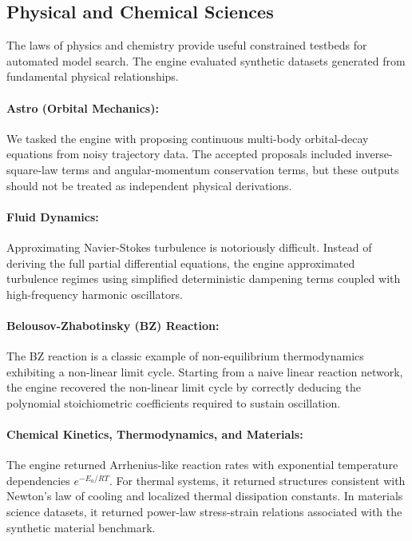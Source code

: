 \subsection{Physical and Chemical Sciences}

The laws of physics and chemistry provide useful constrained testbeds for automated model search. The engine evaluated synthetic datasets generated from fundamental physical relationships.

\paragraph{Astro (Orbital Mechanics):} We tasked the engine with proposing continuous multi-body orbital-decay equations from noisy trajectory data. The accepted proposals included inverse-square-law terms and angular-momentum conservation terms, but these outputs should not be treated as independent physical derivations.
\paragraph{Fluid Dynamics:} Approximating Navier-Stokes turbulence is notoriously difficult. Instead of deriving the full partial differential equations, the engine approximated turbulence regimes using simplified deterministic dampening terms coupled with high-frequency harmonic oscillators.
\paragraph{Belousov-Zhabotinsky (BZ) Reaction:} The BZ reaction is a classic example of non-equilibrium thermodynamics exhibiting a non-linear limit cycle. Starting from a naive linear reaction network, the engine recovered the non-linear limit cycle by correctly deducing the polynomial stoichiometric coefficients required to sustain oscillation.
\paragraph{Chemical Kinetics, Thermodynamics, and Materials:} The engine returned Arrhenius-like reaction rates with exponential temperature dependencies $e^{-E_a/RT}$. For thermal systems, it returned structures consistent with Newton's law of cooling and localized thermal dissipation constants. In materials science datasets, it returned power-law stress-strain relations associated with the synthetic material benchmark.
